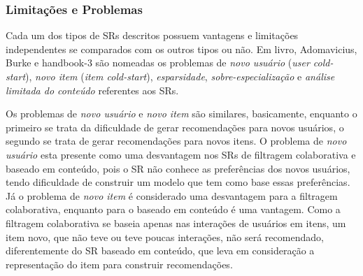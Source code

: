 \documentclass[normaltoc, espacoumemeio, pnumromarab,ruledheader]{abnt}
\begin{document}
 \subsubsection{Limitações e Problemas}
 \label{sec:lim}



Cada um dos tipos de SRs descritos possuem vantagens e limitações independentes se comparados com os outros tipos ou não. Em livro, Adomavicius, Burke e handbook-3 são nomeadas os problemas de \textit{novo usuário} (\textit{user cold-start}), \textit{novo item} (\textit{item cold-start}), \textit{esparsidade}, \textit{sobre-especialização} e \textit{análise limitada do conteúdo} referentes aos SRs.

Os problemas de \textit{novo usuário} e \textit{novo item} são similares, basicamente, enquanto o primeiro se trata da dificuldade de gerar recomendações para novos usuários, o segundo se trata de gerar recomendações para novos itens. O problema de \textit{novo usuário} esta presente como uma desvantagem nos SRs de filtragem colaborativa e baseado em conteúdo, pois o SR não conhece as preferências dos novos usuários, tendo dificuldade de construir um modelo que tem como base essas preferências. Já o problema de \textit{novo item} é considerado uma desvantagem para a filtragem colaborativa, enquanto para o baseado em conteúdo é uma vantagem. Como a filtragem colaborativa se baseia apenas nas interações de usuários em itens, um item novo, que não teve ou teve poucas interações, não será recomendado, diferentemente do SR baseado em conteúdo, que leva em consideração a representação do item para construir recomendações.



\end{document}
